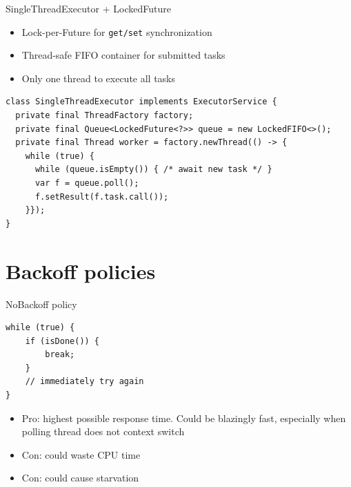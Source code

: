 \begin{frame}{SingleThreadExecutor + LockedFuture}

\begin{itemize}
    \item Lock-per-Future for \texttt{get/set} synchronization
    \item Thread-safe FIFO container for submitted tasks
    \item Only one thread to execute all tasks    
\end{itemize}

\pause
\begin{verbatim}
class SingleThreadExecutor implements ExecutorService {
  private final ThreadFactory factory;
  private final Queue<LockedFuture<?>> queue = new LockedFIFO<>();
  private final Thread worker = factory.newThread(() -> {
    while (true) {
      while (queue.isEmpty()) { /* await new task */ }
      var f = queue.poll();
      f.setResult(f.task.call());
    }});
}
\end{verbatim}
\end{frame}


\section{Backoff policies}
\showTOC

\begin{frame}[fragile]{NoBackoff policy}

\begin{verbatim}
while (true) {
    if (isDone()) {
        break;
    }
    // immediately try again
}
\end{verbatim}

\begin{itemize}
    \pause \item Pro: highest possible response time. Could be blazingly fast, especially when polling thread does not context switch
    \pause \item Con: could waste CPU time
    \pause \item Con: could cause starvation
\end{itemize}
\end{frame}


